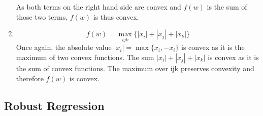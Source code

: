 \begin{enumerate}
\par As both terms on the right hand side are convex and $f(w)$ is the sum of those two terms, $f(w)$ is thus convex.

\par\item\begin{equation}
f(w) = \max_{ijk}\{|x_{i}|+|x_{j}|+|x_{k}|\}
\end{equation}
Once again, the absolute value $|x_{i}| = \max\{x_{i},-x_{i}\}$ is convex as it is the maximum of two convex functions.  The sum $|x_{i}|+|x_{j}|+|x_{k}|$ is convex as it is the sum of convex functions.  The maximum over ijk preserves convexity and therefore $f(w)$ is convex.
\end{enumerate}

\subsection{Robust Regression}
